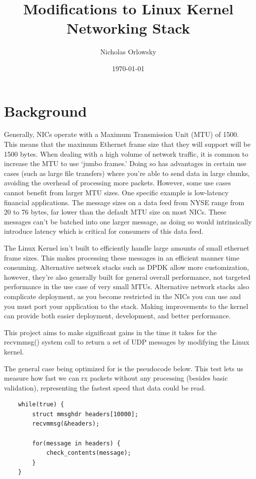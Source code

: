 \documentclass[11pt]{article}
\title{Modifications to Linux Kernel Networking Stack}
\author{Nicholas Orlowsky}
\date{\today}
\begin{document}
\maketitle	


\section{Background}

Generally, NICs operate with a Maximum Transmission Unit (MTU) of 1500. This means that the maximum Ethernet 
frame size that they will support will be 1500 bytes. When dealing with a high volume of network traffic, it 
is common to increase the MTU to use `jumbo frames.' Doing so has advantages in certain use cases (such as large file transfers) where you're 
able to send data in large chunks, avoiding the overhead of processing more packets. However, some use cases cannot benefit from larger MTU 
sizes. One specific example is low-latency financial applications. The message sizes on a data feed from 
NYSE range from 20 to 76 bytes, far lower than the default MTU size on most NICs\cite{nyse}. These messages can't 
be batched into one larger message, as doing so would intrinsically introduce latency which is critical for 
consumers of this data feed.

The Linux Kernel isn't built to efficiently handle large amounts of small ethernet frame sizes. This makes processing 
these messages in an efficient manner time consuming. Alternative network stacks such as DPDK allow more 
customization, however, they're also generally built for general overall performance, not targeted performance 
in the use case of very small MTUs. Alternative network stacks also complicate deployment, as you become restricted 
in the NICs you can use and you must port your application to the stack. Making improvements to the kernel 
can provide both easier deployment, development, and better performance. 

This project aims to make significant gains in the time it takes for the recvmmsg() system call to return a set of 
UDP messages by modifying the Linux kernel.

The general case being optimized for is the pseudocode below. This test lets us measure how fast we can rx packets without any 
processing (besides basic validation), representing the fastest speed that data could be read.

\begin{verbatim}
    while(true) {
        struct mmsghdr headers[10000];
        recvmmsg(&headers);

        for(message in headers) {
            check_contents(message);
        }
    }
\end{verbatim}
\end{document}
